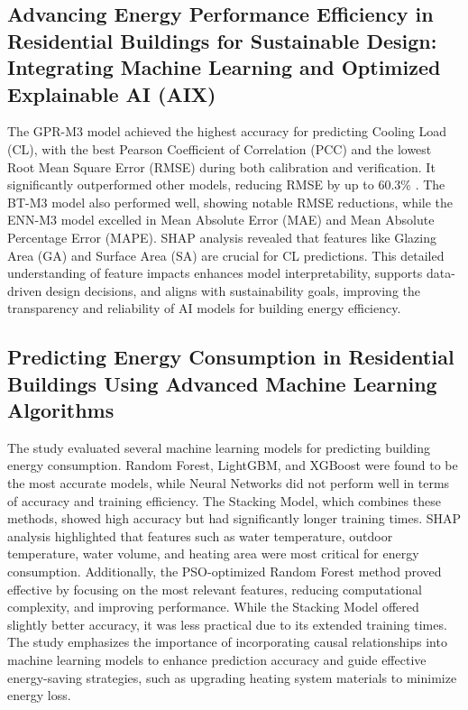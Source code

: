 \documentclass[a4paper, 12pt]{article}
\begin{document}
\subsection{Advancing Energy Performance Efficiency in Residential Buildings for Sustainable Design: Integrating Machine Learning and Optimized Explainable AI (AIX)}
\quad The GPR-M3 model achieved the highest accuracy for predicting Cooling Load (CL), with the best Pearson Coefficient of Correlation (PCC) and the lowest Root Mean Square Error (RMSE) during both calibration and verification. It significantly outperformed other models, reducing RMSE by up to 60.3\% \cite{Badr24}. The BT-M3 model also performed well, showing notable RMSE reductions, while the ENN-M3 model excelled in Mean Absolute Error (MAE) and Mean Absolute Percentage Error (MAPE). SHAP analysis revealed that features like Glazing Area (GA) and Surface Area (SA) are crucial for CL predictions. This detailed understanding of feature impacts enhances model interpretability, supports data-driven design decisions, and aligns with sustainability goals, improving the transparency and reliability of AI models for building energy efficiency.
\vspace{7pt}

\subsection{Predicting Energy Consumption in Residential Buildings Using Advanced Machine Learning Algorithms}
\quad The study evaluated several machine learning models for predicting building energy consumption. Random Forest, LightGBM, and XGBoost were found to be the most accurate models, while Neural Networks did not perform well in terms of accuracy and training efficiency. The Stacking Model, which combines these methods, showed high accuracy but had significantly longer training times. SHAP analysis highlighted that features such as water temperature, outdoor temperature, water volume, and heating area were most critical for energy consumption. Additionally, the PSO-optimized Random Forest method proved effective by focusing on the most relevant features, reducing computational complexity, and improving performance. While the Stacking Model offered slightly better accuracy, it was less practical due to its extended training times. The study emphasizes the importance of incorporating causal relationships into machine learning models to enhance prediction accuracy and guide effective energy-saving strategies, such as upgrading heating system materials to minimize energy loss.
\vspace{7pt}
\end{document}

